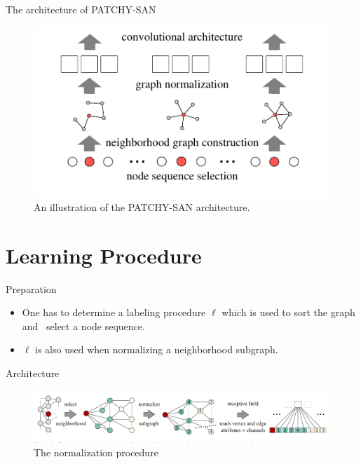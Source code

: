 \documentclass[dvipdfmx]{beamer}
\begin{document}
  \begin{frame}{The architecture of PATCHY-SAN}
    \begin{figure}[h]
      \centering
      \includegraphics[width=0.8\paperwidth]{img/Fig2.pdf}
      \caption{An illustration of the PATCHY-SAN architecture.}
    \end{figure}
  \end{frame}

\section{Learning Procedure}

  \begin{frame}{Preparation}
    \begin{itemize}
      \item One has to determine a \alert{labeling procedure $\ell$} which is used to sort the graph and \
        select a node sequence.
      \item $\ell$ is also used when normalizing a neighborhood subgraph.
    \end{itemize}
  \end{frame}

  \begin{frame}{Architecture}
    \begin{figure}[h]
      \centering
      \includegraphics[width=0.9\paperwidth]{img/Fig3.pdf}
      \caption{The normalization procedure}
    \end{figure}
  \end{frame}
\end{document}
